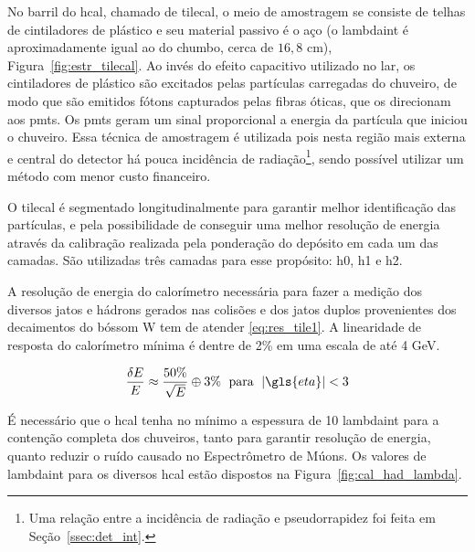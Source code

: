 No barril do \gls{hcal}, chamado de \gls{tilecal}, o meio de amostragem se consiste de telhas de
cintiladores de plástico e seu material passivo é o aço (o \gls{lambdaint} é
aproximadamente igual ao do chumbo, cerca de $16,8$ cm), Figura~\ref{fig:estr_tilecal}. 
Ao invés do efeito capacitivo utilizado no \gls{lar}, os cintiladores de
plástico são excitados pelas partículas carregadas do chuveiro, de modo que são
emitidos fótons capturados pelas fibras óticas, que os direcionam aos
\glspl{pmt}. Os \glspl{pmt} geram um sinal proporcional a energia da partícula
que iniciou o chuveiro.
Essa técnica de amostragem é utilizada pois nesta região mais externa e central do detector 
há pouca incidência de radiação\footnote{Uma relação entre a incidência de
radiação e pseudorrapidez foi feita em Seção~\ref{ssec:det_int}.\label{fn:radiacao}}, 
sendo possível utilizar um método com menor custo financeiro.

O \gls{tilecal} é segmentado longitudinalmente para garantir melhor identificação
das partículas, e pela possibilidade de conseguir uma melhor resolução de
energia através da calibração realizada pela ponderação do depósito em cada um
das camadas. São utilizadas três camadas para esse propósito: \gls{h0}, \gls{h1} 
e \gls{h2}.

A resolução de energia do calorímetro necessária para fazer a medição dos
diversos jatos e hádrons gerados nas colisões e dos jatos duplos provenientes 
dos decaimentos do bóssom W tem de atender \ref{eq:res_tile1}. 
A linearidade de resposta do calorímetro mínima é dentre de 2\% em uma escala de até 4
GeV.

\begin{equation}\label{eq:res_tile1}
\frac{\delta E}{E} \approx \frac{50\%}{\sqrt{E}} \oplus 3\% \;\ \text{para} \;\
|\gls{eta}|<3
\end{equation}

É necessário que o \gls{hcal} tenha no mínimo a espessura de 10 \gls{lambdaint}
para a contenção completa dos chuveiros, tanto para garantir resolução de
energia, quanto reduzir o ruído causado no Espectrômetro de Múons. Os valores de
\gls{lambdaint} para os diversos \gls{hcal} estão dispostos na
Figura~\ref{fig:cal_had_lambda}.

